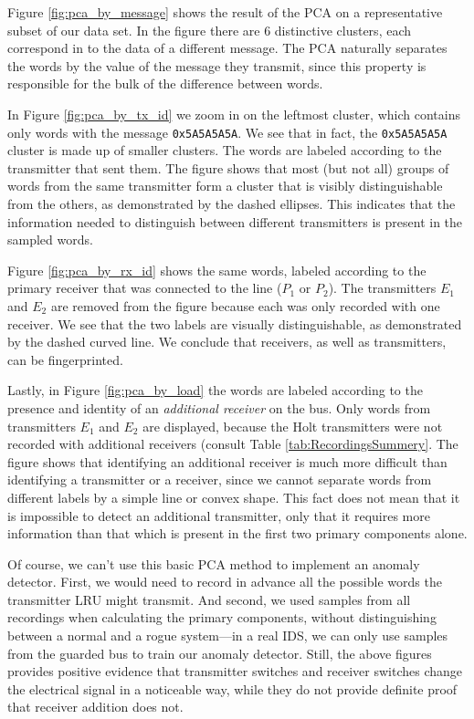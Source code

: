 \documentclass[compsoc,conference,a4paper,10pt,times]{IEEEtran}
\begin{document}
  Figure \ref{fig:pca_by_message} shows the result of the PCA on a representative subset of our data set. In the figure there are 6 distinctive clusters, each correspond in to the data of a different message. The PCA naturally separates the words by the value of the message they transmit, since this property is responsible for the bulk of the difference between words.
  
  In Figure \ref{fig:pca_by_tx_id} we zoom in on the leftmost cluster, which contains only words with the message \texttt{0x5A5A5A5A}. We see that in fact, the \texttt{0x5A5A5A5A} cluster is made up of smaller clusters. The words are labeled according to the transmitter that sent them. The figure shows that most (but not all) groups of words from the same transmitter form a cluster that is visibly distinguishable from the others, as demonstrated by the dashed ellipses. This indicates that the information needed to distinguish between different transmitters is present in the sampled words.
  
  Figure \ref{fig:pca_by_rx_id} shows the same words, labeled according to the primary receiver that was connected to the line ($P_1$ or $P_2$). The transmitters $E_1$ and $E_2$ are removed from the figure because each was only recorded with one receiver. We see that the two labels are visually distinguishable, as demonstrated by the dashed curved line. We conclude that receivers, as well as transmitters, can be fingerprinted.
  
  Lastly, in Figure \ref{fig:pca_by_load} the words are labeled according to the presence and identity of an \textit{additional receiver} on the bus. Only words from transmitters $E_1$ and $E_2$ are displayed, because the Holt transmitters were not recorded with additional receivers (consult Table \ref{tab:RecordingsSummery}. The figure shows that identifying an additional receiver is much more difficult than identifying a transmitter or a receiver, since we cannot separate words from different labels by a simple line or convex shape. This fact does not mean that it is impossible to detect an additional transmitter, only that it requires more information than that which is present in the first two primary components alone.
  
  Of course, we can't use this basic PCA method to implement an anomaly detector. First, we would need to record in advance all the possible words the transmitter LRU might transmit. And second, we used samples from all recordings when calculating the primary components, without distinguishing between a normal and a rogue system---in a real IDS, we can only use samples from the guarded bus to train our anomaly detector. Still, the above figures provides positive evidence that transmitter switches and receiver switches change the electrical signal in a noticeable way, while they do not provide definite proof that receiver addition does not.
\end{document}

